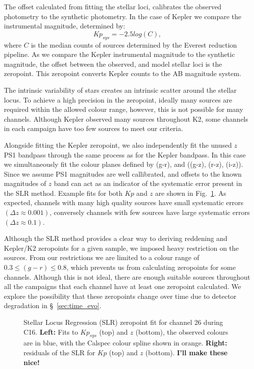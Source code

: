 \documentclass{aastex63}
\begin{document}
The offset calculated from fitting the stellar loci, calibrates the observed photometry to the synthetic photometry. In the case of Kepler we compare the instrumental magnitude, determined by:
\begin{equation}
    Kp_{sys} = -2.5log(C),
\end{equation}
where $C$ is the median counts of sources determined by the Everest reduction pipeline. As we compare the Kepler instrumental magnitude to the synthetic magnitude, the offset between the observed, and model stellar loci is the zeropoint. This zeropoint converts Kepler counts to the AB magnitude system.

The intrinsic variability of stars creates an intrinsic scatter around the stellar locus. To achieve a high precision in the zeropoint, ideally many sources are required within the allowed colour range, however, this is not possible for many channels. Although Kepler observed many sources throughout K2, some channels in each campaign have too few sources to meet our criteria. 

Alongside fitting the Kepler zeropoint, we also independently fit the unused $z$ PS1 bandpass through the same process as for the Kepler bandpass. In this case we simultaneously fit the colour planes defined by (g-r), and ((g-z), (r-z), (i-z)). Since we assume PS1 magnitudes are well callibrated, and offsets to the known magnitudes of $z$ band can act as an indicator of the systematic error present in the SLR method. Example fits for both $Kp$ and $z$ are shown in Fig.~\ref{fig:slr_fit}. As expected, channels with many high quality sources have small systematic errors $(\Delta z \approx 0.001)$, conversely channels with few sources have large systematic errors $(\Delta z \approx 0.1)$.


Although the SLR method provides a clear way to deriving reddening and Kepler/K2 zeropoints for a given sample, we imposed heavy restriction on the sources. From our restrictions we are limited to a colour range of $0.3 \leq (g-r)\leq 0.8$, which prevents us from calculating zeropoints for some channels. Although this is not ideal, there are enough suitable sources throughout all the campaigns that each channel have at least one zeropoint calculated. We explore the possibility that these zeropoints change over time due to detector degradation in \S~\ref{sec:time_evo}.

\begin{figure}
    \caption{Stellar Locus Regression (SLR) zeropoint fit for channel 26 during C16. \textbf{Left:} Fits to $Kp_{sys}$ (top) and $z$ (bottom), the observed colours are in blue, with the Calspec colour spline shown in orange. \textbf{Right:} residuals of the SLR for $Kp$ (top) and $z$ (bottom). \textbf{I'll make these nice!}}
    \label{fig:slr_fit}
\end{figure}
\end{document}
